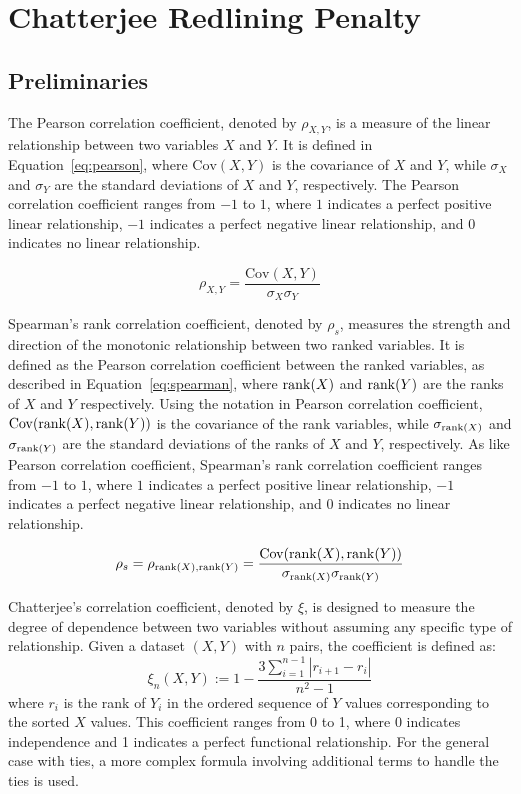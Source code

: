 \chapter{Chatterjee Redlining Penalty}

\section{Preliminaries}

The Pearson correlation coefficient, denoted by $\rho_{X,Y}$, is a measure of the linear relationship between two variables $X$ and $Y$. It is defined in Equation~\ref{eq:pearson}, where $\mathrm{Cov}(X, Y)$ is the covariance of $X$ and $Y$, while $\sigma_X$ and $\sigma_Y$ are the standard deviations of $X$ and $Y$, respectively. The Pearson correlation coefficient ranges from $-1$ to $1$, where $1$ indicates a perfect positive linear relationship, $-1$ indicates a perfect negative linear relationship, and $0$ indicates no linear relationship.

\begin{equation}\label{eq:pearson}
\rho_{X,Y} = \frac{\mathrm{Cov}(X, Y)}{\sigma_X \sigma_Y}
\end{equation}

Spearman's rank correlation coefficient, denoted by $\rho_s$, measures the strength and direction of the monotonic relationship between two ranked variables. It is defined as the Pearson correlation coefficient between the ranked variables, as described in Equation~\ref{eq:spearman}, where $\operatorname{rank}(X)$ and $\operatorname{rank}(Y)$ are the ranks of $X$ and $Y$ respectively. Using the notation in Pearson correlation coefficient, $\mathrm{Cov}(\operatorname{rank}(X), \operatorname{rank}(Y))$ is the covariance of the rank variables, while $\sigma_{\operatorname{rank}(X)}$ and $\sigma_{\operatorname{rank}(Y)}$ are the standard deviations of the ranks of $X$ and $Y$, respectively. As like Pearson correlation coefficient, Spearman's rank correlation coefficient ranges from $-1$ to $1$, where $1$ indicates a perfect positive linear relationship, $-1$ indicates a perfect negative linear relationship, and $0$ indicates no linear relationship.

\begin{equation}\label{eq:spearman}
\rho_s = \rho_{\operatorname{rank}(X),\operatorname{rank}(Y)} = \frac{\mathrm{Cov}(\operatorname{rank}(X), \operatorname{rank}(Y))}{\sigma_{\operatorname{rank}(X)} \sigma_{\operatorname{rank}(Y)}}
\end{equation}

Chatterjee's correlation coefficient, denoted by $\xi$, is designed to measure the degree of dependence between two variables without assuming any specific type of relationship. Given a dataset $(X, Y)$ with $n$ pairs, the coefficient is defined as:
\begin{equation}
\xi_n(X,Y) := 1 - \frac{3 \sum_{i=1}^{n-1} |r_{i+1} - r_i|}{n^2 - 1}
\end{equation}
where $r_i$ is the rank of $Y_i$ in the ordered sequence of $Y$ values corresponding to the sorted $X$ values. This coefficient ranges from 0 to 1, where 0 indicates independence and 1 indicates a perfect functional relationship. For the general case with ties, a more complex formula involving additional terms to handle the ties is used.


